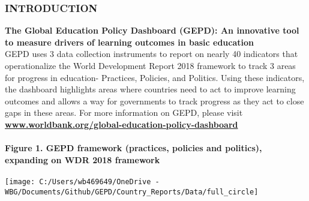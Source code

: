 \documentclass[twocolumn]{article}
\author{}
\date{\vspace{-2.5em}}
\let\oldparagraph\paragraph
\renewcommand{\paragraph}[1]{\oldparagraph{#1}\mbox{}}
\begin{document}
\newcommand{\greynote}[1]{
    {\scriptsize
    \textcolor{darkgray}{\textit{Notes:} #1}
  }
}

\newcommand{\greysource}[1]{
    {\scriptsize
    \textcolor{darkgray}{\textit{Source:} #1}
  }
}

\newcommand{\greydisclaimer}[1]{
    {\scriptsize
    \textcolor{darkgray}{\textit{Disclaimer:} #1}
  }
}

\newcommand{\greytext}[1]{
    {\scriptsize
    \textcolor{darkgray}{#1}
  }
}

\newcommand*{\tabindent}{\hspace{1mm}}

\hypertarget{introduction}{%
\subsubsection{\texorpdfstring{\textbf{INTRODUCTION}}{INTRODUCTION}}\label{introduction}}

\textbf{The Global Education Policy Dashboard (GEPD): An innovative tool
to measure drivers of learning outcomes in basic education}\\
GEPD uses 3 data collection instruments to report on nearly 40
indicators that operationalize the World Development Report 2018
framework to track 3 areas for progress in education- Practices,
Policies, and Politics. Using these indicators, the dashboard highlights
areas where countries need to act to improve learning outcomes and
allows a way for governments to track progress as they act to close gaps
in these areas. For more information on GEPD, please visit
\textbf{\href{https://www.worldbank.org/en/topic/education/brief/global-education-policy-dashboard}{www.worldbank.org/global-education-policy-dashboard}}

\hypertarget{figure-1.-gepd-framework-practices-policies-and-politics-expanding-on-wdr-2018-framework}{%
\paragraph{Figure 1. GEPD framework (practices, policies and politics),
expanding on WDR 2018
framework}\label{figure-1.-gepd-framework-practices-policies-and-politics-expanding-on-wdr-2018-framework}}

\begin{center}\texttt{[image: C:/Users/wb469649/OneDrive - WBG/Documents/Github/GEPD/Country\_Reports/Data/full\_circle]} \end{center}
\end{document}
